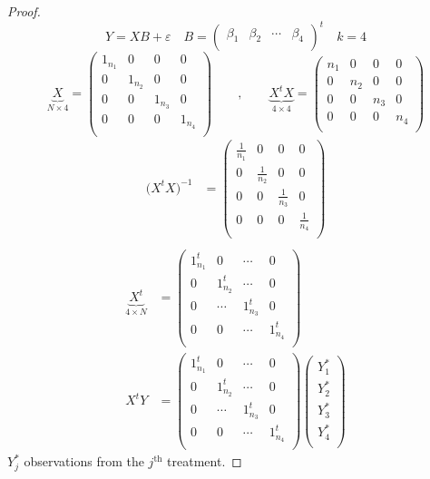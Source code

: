 \documentclass[11pt,a4paper]{article}
\theoremstyle{definition}
\begin{document}
\begin{proof}
$$Y=XB+\varepsilon\quad  B=
\begin{pmatrix}
\beta_1 & \beta_2 & \cdots & \beta_4\\
\end{pmatrix}^t\quad  k=4$$
$$
\underbrace{X}_{N\times 4}  =
\begin{pmatrix}
1_{n_1} & 0 & 0 & 0\\
0  & 1_{n_2} & 0 & 0\\
0 & 0 &  1_{n_3} & 0\\
0 & 0 & 0 & 1_{n_4}\\
\end{pmatrix}\qquad ,\qquad 
\underbrace{X^tX}_{4\times 4}  = 
\begin{pmatrix}
n_1 & 0 & 0 & 0\\
0 & n_2 & 0 & 0\\
0 & 0 & n_3 & 0\\
0 & 0 & 0 & n_4\\
\end{pmatrix}
$$
\begin{align*}
\big(X^tX\big)^{-1} & =
\begin{pmatrix}
\frac{1}{n_1} & 0 & 0 & 0\\
0 & \frac{1}{n_2} & 0 & 0\\
0 & 0 & \frac{1}{n_3} & 0\\
0 & 0 & 0 & \frac{1}{n_4}\\
\end{pmatrix}\\
\end{align*}
\begin{align*}
\underbrace{X^t}_{4\times N} & =
\begin{pmatrix}
1^t_{n_1} & 0 & \cdots & 0\\
0 & 1^t_{n_2} & \cdots & 0\\
0 & \cdots & 1^t_{n_3} & 0\\
0 & 0 & \cdots & 1^t_{n_4}\\ 
\end{pmatrix}\\
X^tY & = 
\begin{pmatrix}
1^t_{n_1} & 0 & \cdots & 0\\
0 & 1^t_{n_2} & \cdots & 0\\
0 & \cdots & 1^t_{n_3} & 0\\
0 & 0 & \cdots & 1^t_{n_4}\\
\end{pmatrix}
\begin{pmatrix}
Y^*_1\\ Y^*_2\\ Y^*_3\\ Y^*_4\\
\end{pmatrix}
\end{align*}
$Y^*_j$ observations from the $j^{\text{th}}$ treatment.
\end{proof}
\end{document}
